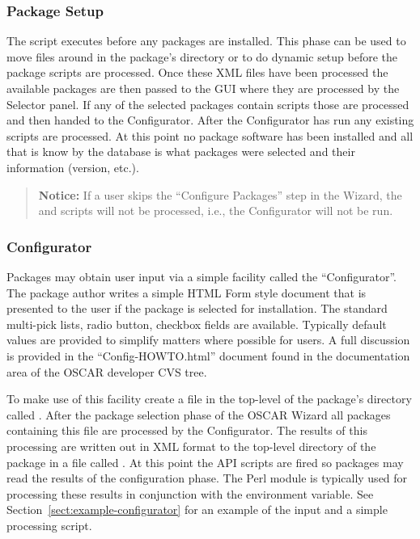 \subsubsection{Package Setup}

The  script executes before any packages are installed.  This
phase can be used to move files around in the package's directory or to do
dynamic setup before the package  scripts are processed.
Once these XML files have been processed the available packages are then
passed to the GUI where they are processed by the Selector panel.  If any
of the selected packages contain  scripts those are
processed and then handed to the Configurator.  After the Configurator has
run any existing  scripts are processed.  At this
point no package software has been installed and all that is know by the
database is what packages were selected and their 
information (version, etc.).

\begin{verse}
   {\bfseries Notice: } If a user skips the ``Configure Packages'' step in
   the Wizard, the  and  scripts
   will not be processed, i.e., the Configurator will not be run. 
\end{verse}

\subsubsection{Configurator}
\label{sect:pkg-configurator}

Packages may obtain user input via a simple facility called the
``Configurator''.  The package author writes a simple HTML Form style
document that is presented to the user if the package is selected for
installation.  The standard multi-pick lists, radio button, checkbox fields
are available.  Typically default values are provided to simplify matters
where possible for users.  A full discussion is provided in the
``Config-HOWTO.html'' document found in the documentation area of the OSCAR
developer CVS tree.

To make use of this facility create a file in the top-level of the
package's directory called .  After the package
selection phase of the OSCAR Wizard all packages containing this file are
processed by the Configurator.  The results of this processing are written
out in XML format to the top-level directory of the package in a file
called .  At this point the
 API scripts are fired so packages may read the
results of the configuration phase.    The Perl  module
is typically used for processing these results in conjunction with the
 environment variable.  See
Section~\ref{sect:example-configurator} for an example of the input and
a simple processing script.


